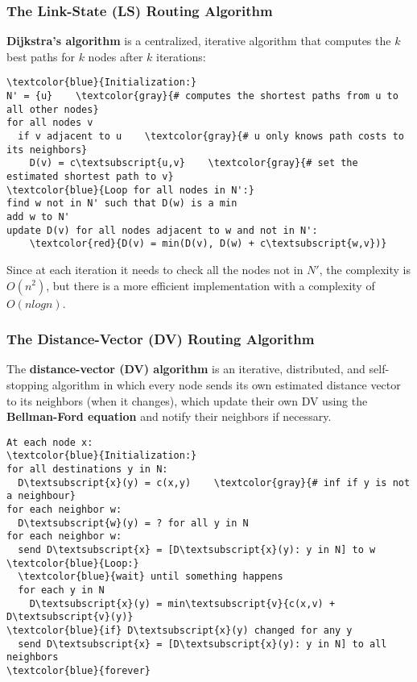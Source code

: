 \documentclass{article}
\begin{document}
\subsubsection{The Link-State (LS) Routing Algorithm}
\textbf{Dijkstra's algorithm} is a centralized, iterative algorithm that computes the $k$ best paths for $k$ nodes after $k$ iterations:
\begin{Verbatim}[commandchars=\\\{\}]
\textcolor{blue}{Initialization:}
N' = {u}    \textcolor{gray}{# computes the shortest paths from u to all other nodes}
for all nodes v
  if v adjacent to u    \textcolor{gray}{# u only knows path costs to its neighbors}
    D(v) = c\textsubscript{u,v}    \textcolor{gray}{# set the estimated shortest path to v}
\textcolor{blue}{Loop for all nodes in N':}
find w not in N' such that D(w) is a min
add w to N'
update D(v) for all nodes adjacent to w and not in N':
    \textcolor{red}{D(v) = min(D(v), D(w) + c\textsubscript{w,v})}
\end{Verbatim}
Since at each iteration it needs to check all the nodes not in $N'$, the complexity is $O(n^2)$, but there is a more efficient implementation with a complexity of $O(nlogn)$.
\subsubsection{The Distance-Vector (DV) Routing Algorithm}
The \textbf{distance-vector (DV) algorithm} is an iterative, distributed, and self-stopping algorithm in which every node sends its own estimated distance vector to its neighbors (when it changes), which update their own DV using the \textbf{Bellman-Ford equation} and notify their neighbors if necessary.
\begin{Verbatim}[commandchars=\\\{\}]
At each node x:
\textcolor{blue}{Initialization:}
for all destinations y in N:
  D\textsubscript{x}(y) = c(x,y)    \textcolor{gray}{# inf if y is not a neighbour}
for each neighbor w:
  D\textsubscript{w}(y) = ? for all y in N
for each neighbor w:
  send D\textsubscript{x} = [D\textsubscript{x}(y): y in N] to w
\textcolor{blue}{Loop:}
  \textcolor{blue}{wait} until something happens
  for each y in N
    D\textsubscript{x}(y) = min\textsubscript{v}{c(x,v) + D\textsubscript{v}(y)}
\textcolor{blue}{if} D\textsubscript{x}(y) changed for any y
  send D\textsubscript{x} = [D\textsubscript{x}(y): y in N] to all neighbors
\textcolor{blue}{forever}
\end{Verbatim}
\end{document}
